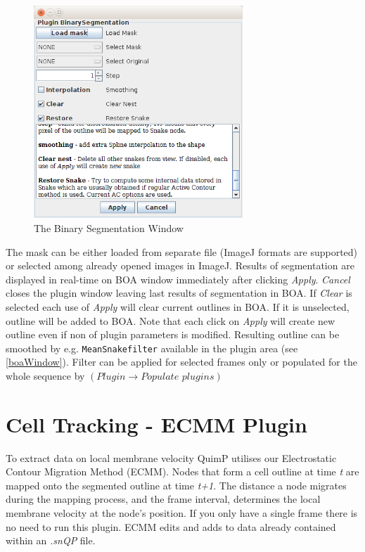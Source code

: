 \documentclass[a4paper,12pt]{article}
\begin{document}
\begin{figure}[!h]
	\centering
	\includegraphics[height=8cm]{BinarySeg.png}
	\caption{The Binary Segmentation Window}
	\label{BinarySegWindow}
\end{figure}

The mask can be either loaded from separate file (ImageJ formats are supported) or selected among already opened images in ImageJ. Results of segmentation are displayed in real-time on BOA window immediately after clicking \textit{Apply}. \textit{Cancel} closes the plugin window leaving last results of segmentation in BOA. If \textit{Clear} is selected each use of \textit{Apply} will clear current outlines in BOA. If it is unselected, outline will be added to BOA. Note that each click on \textit{Apply} will create new outline even if non of plugin parameters is modified. 
Resulting outline can be smoothed by e.g. \texttt{MeanSnakefilter} available in the plugin area (see \autoref{boaWindow}). Filter can be applied for selected frames only or populated for the whole sequence by $(\textit{Plugin}\rightarrow \textit{Populate plugins})$
 
\section{Cell Tracking - ECMM Plugin}

To extract data on local membrane velocity QuimP utilises our Electrostatic Contour Migration Method (ECMM).  
Nodes that form a cell outline at time \textit{t} are mapped onto the segmented outline at time \textit{t+1}.  The distance a node migrates
during the mapping process, and the frame interval, determines the local membrane velocity at the node's position.  If you only have a single
frame there is no need to run this plugin.  ECMM edits and adds to data 
already contained within an \textit{.snQP} file.
\end{document}
